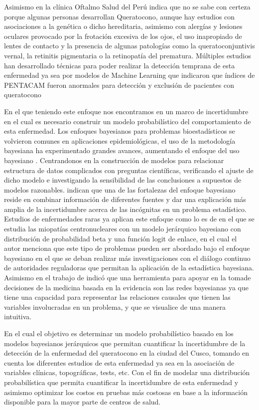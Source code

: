 Asimismo en la clínica Oftalmo Salud del Perú indica que no se sabe con certeza porque algunas personas desarrollan Queratocono, aunque hay estudios con asociaciones a la genética o dicho hereditaria, asimismo con alergías y lesiones oculares provocado por la frotación excesiva de los ojos, el uso inapropiado de lentes de contacto y la presencia de algunas patologías como la queratoconjuntivis vernal, la retinitis pigmentaria o la retinopatía del prematura. Múltiples estudios han desarrollado técnicas para poder realizar la detección temprana de esta enfermedad ya sea por modelos de Machine Learning que indicaron que índices de PENTACAM fueron anormales para detección y exclusión de pacientes con queratocono \parencite{zhao2024evaluation}

En el que teniendo este enfoque nos encontramos en un marco de incertidumbre en el cual es necesario construir un modelo probabilístico del comportamiento de esta enfermedad. Los enfoques bayesianos para problemas bioestadísticos se volvieron comunes en aplicaciones epidemiológicas, el uso de la metodología bayesiana ha experimentado grandes avances, aumentando el enfoque del uso bayesiano \textcite{lawson2018bayesian}. Centrandonos en la construcción de modelos para relacionar estructura de datos complicados con preguntas científicas, verificando el ajuste de dicho modelo e investigando la sensibilidad de las conclusiones a supuestos de modelos razonables. \textcite{Gelman_2013} indican que una de las fortalezas del enfoque bayesiano reside en combinar información de diferentes fuentes y dar una explicación más amplia de la incertidumbre acerca de las incógnitas en un problema estadístico.
Estudios de enfermedades raras ya aplican este enfoque como lo es de \textcite{fouarge2021hierarchical} en el que se estudia las miopatías centronucleares con un modelo jerárquico bayesiano con distribución de probabilidad beta y una función logit de enlace, en el cual el autor menciona que este tipo de problemas pueden ser abordado bajo el enfoque bayesiano en el que se deban realizar más investigaciones con el diálogo continuo de autoridades reguladoras que permitan la aplicación de la estadística bayesiana. Asimismo en el trabajo de \textcite{ferez2017redes} indicó que una herramienta para apoyar en la tomade decisiones de la medicina basada en la evidencia son las redes bayesianas ya que tiene una capacidad para representar las relaciones causales que tienen las variables involucradas en un problema, y que se visualice de una manera intuitiva.

En el cual el objetivo es determinar un modelo probabilístico basado en los modelos bayesianos jerárquicos que permitan cuantificar la incertidumbre de la detección de la enfermedad del queratocono en la ciudad del Cusco, tomando en cuenta los diferentes estudios de esta enfermedad ya sea en la asociación de variables clínicas, topográficas, tests, etc. Con el fin de modelar una distribución probabilística que permita cuantificar la incertidumbre de esta enfermedad y asimismo optimizar los costos en pruebas más costosas en base a la información disponible para la mayor parte de centros de salud.

